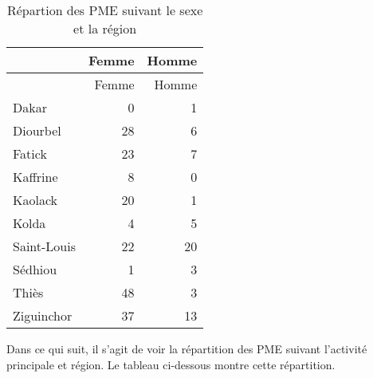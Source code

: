 \documentclass[
]{article}
\newenvironment{Shaded}{\begin{snugshade}}{\end{snugshade}}
\newcommand{\AttributeTok}[1]{\textcolor[rgb]{0.77,0.63,0.00}{#1}}
\newcommand{\FunctionTok}[1]{\textcolor[rgb]{0.00,0.00,0.00}{#1}}
\newcommand{\NormalTok}[1]{#1}
\newcommand{\OtherTok}[1]{\textcolor[rgb]{0.56,0.35,0.01}{#1}}
\newcommand{\SpecialCharTok}[1]{\textcolor[rgb]{0.00,0.00,0.00}{#1}}
\newcommand{\StringTok}[1]{\textcolor[rgb]{0.31,0.60,0.02}{#1}}
\begin{document}
\begin{Shaded}
\end{Shaded}

\begin{longtable}[]{@{}lrr@{}}
\caption{Répartion des PME suivant le sexe et la région}\tabularnewline
\toprule()
& Femme & Homme \\
\midrule()
\endfirsthead
\toprule()
& Femme & Homme \\
\midrule()
\endhead
Dakar & 0 & 1 \\
Diourbel & 28 & 6 \\
Fatick & 23 & 7 \\
Kaffrine & 8 & 0 \\
Kaolack & 20 & 1 \\
Kolda & 4 & 5 \\
Saint-Louis & 22 & 20 \\
Sédhiou & 1 & 3 \\
Thiès & 48 & 3 \\
Ziguinchor & 37 & 13 \\
\bottomrule()
\end{longtable}

Dans ce qui suit, il s'agit de voir la répartition des PME suivant
l'activité principale et région. Le tableau ci-dessous montre cette
répartition.

\begin{Shaded}
\end{Shaded}
\end{document}
